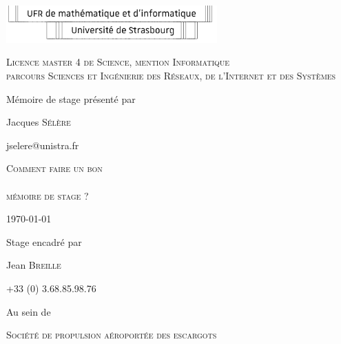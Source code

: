\documentclass [twoside,openright,a4paper,11pt,french] {report}
\begin{document}

\thispagestyle{empty}

\begin{center}
    \includegraphics [width=8.1cm] {logo-ufr.pdf}       

    \vfill\vfill

    {
	\large
	\textsc {
	    Licence master 4 de Science, mention Informatique \\
	    parcours Sciences et Ingénierie des Réseaux, de l'Internet et des Systèmes
	}
    }

    \bigskip\bigskip

    {\large Mémoire de stage présenté par}

    \medskip

    {\large Jacques \textsc {Sélère}}

    {\small jselere@unistra.fr}

    \vfill

    {
	\huge
	\textsc {
	    Comment faire un bon \\
	    ~ \\
	    mémoire de stage ?
	}
    }

    \vfill

    \today

    \vfill

    {\large Stage encadré par}

    \medskip

    {\large Jean \textsc {Breille}}

    {\small +33 (0) 3.68.85.98.76}

    \bigskip

    {\large Au sein de}

    \medskip

    {
	\large
	\textsc {Société de propulsion aéroportée des escargots}
    }

    \bigskip
    \bigskip


\end{center}
\end{document}
